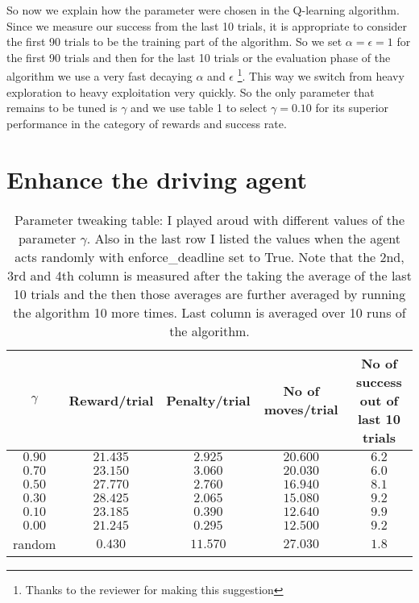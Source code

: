 \documentclass{article}
\begin{document}
So now we explain how the parameter were chosen in the Q-learning algorithm. Since we measure our success from the last 10 trials, it is appropriate to consider the first 90 trials to be the training part of the algorithm. So we set $\alpha=\epsilon=1$ for the first 90 trials and then for the last 10 trials or the evaluation phase of the algorithm we use a very fast decaying $\alpha$ and $\epsilon$ \footnote{Thanks to the reviewer for making this suggestion}. This way we switch from heavy exploration to heavy exploitation very quickly. So the only parameter that remains to be tuned is $\gamma$ and we use table 1 to select $\gamma = 0.10$ for its superior performance in the category of rewards and success rate.


\section{Enhance the driving agent}


\begin{table}
  \begin{center}
    \begin{tabular}{ | c || c | c | c | C |}
      \hline
      $\gamma$ & Reward/trial & Penalty/trial & No of moves/trial & No of success out of last 10 trials \\ \hline\hline
      $ 0.90 $ & $21.435$ & $2.925$ & $20.600$ & $6.2$ \\ \hline 
      $ 0.70 $ & $23.150$ & $3.060$ & $20.030$ & $6.0$ \\ \hline 
      $ 0.50 $ & $27.770$ & $2.760$ & $16.940$ & $8.1$ \\ \hline 
      $ 0.30 $ & $28.425$ & $2.065$ & $15.080$ & $9.2$ \\ \hline\hline
      $ 0.10 $ & $23.185$ & $0.390$ & $12.640$ & $9.9$ \\ \hline\hline      
      $ 0.00 $ & $21.245$ & $0.295$ & $12.500$ & $9.2$ \\ \hline\hline\hline
      random   & $0.430$ & $11.570$ & $27.030$ & $1.8$ \\ \hline
    \end{tabular}
   \end{center}
  \caption{Parameter tweaking table: I played aroud with different values of the parameter $\gamma$. Also in the last row I listed the values when the agent acts randomly with enforce\_deadline set to True. Note that the 2nd, 3rd and 4th column is measured after the taking the average of the last 10 trials and the then those averages are further averaged by running the algorithm 10 more times. Last column is averaged over 10 runs of the algorithm. }
\end{table}
\end{document}
